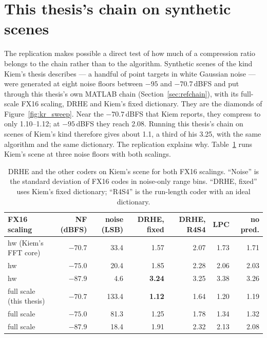 \section{This thesis's chain on synthetic scenes}
\label{sec:kr_scaling}

The replication makes possible a direct test of how much of a compression ratio
belongs to the chain rather than to the algorithm. Synthetic scenes of the kind
Kiem's thesis describes --- a handful of point targets in white Gaussian noise
--- were generated at eight noise floors between $-95$ and $-70.7$\,dBFS and put
through this thesis's own MATLAB chain (Section~\ref{sec:refchain}), with its
full-scale FX16 scaling, DRHE and Kiem's fixed dictionary. They are the
diamonds of Figure~\ref{fig:kr_sweep}. Near the $-70.7$\,dBFS that Kiem
reports, they compress to only \num{1.10}--\num{1.12}; at $-95$\,dBFS they
reach \num{2.08}. Running this thesis's chain on scenes of Kiem's kind therefore
gives about \num{1.1}, a third of his \num{3.25}, with the same algorithm and
the same dictionary. The replication explains why. Table~\ref{tab:kr_scaletab}
runs Kiem's scene at three noise floors with both scalings.

\begin{table}[htbp]
\centering
\caption[FX16 scaling and noise floor]{DRHE and the other coders on Kiem's
scene for both FX16 scalings. ``Noise'' is the standard deviation of FX16 codes
in noise-only range bins. ``DRHE, fixed'' uses Kiem's fixed dictionary;
``R4S4'' is the run-length coder with an ideal dictionary.}
\label{tab:kr_scaletab}
\small
\setlength{\tabcolsep}{5pt}
\begin{tabular}{@{}lrrrrrr@{}}
\toprule
FX16 scaling & NF (dBFS) & noise (LSB) & DRHE, fixed & DRHE, R4S4 & LPC & no pred.\\
\midrule
hw (Kiem's FFT core) & $-70.7$ & 33.4 & 1.57 & 2.07 & 1.73 & 1.71\\
hw                   & $-75.0$ & 20.4 & 1.85 & 2.28 & 2.06 & 2.03\\
hw                   & $-87.9$ & 4.6  & \textbf{3.24} & 3.25 & 3.38 & 3.26\\
full scale (this thesis) & $-70.7$ & 133.4 & \textbf{1.12} & 1.64 & 1.20 & 1.19\\
full scale           & $-75.0$ & 81.3 & 1.25 & 1.78 & 1.34 & 1.32\\
full scale           & $-87.9$ & 18.4 & 1.91 & 2.32 & 2.13 & 2.08\\
\bottomrule
\end{tabular}
\end{table}

